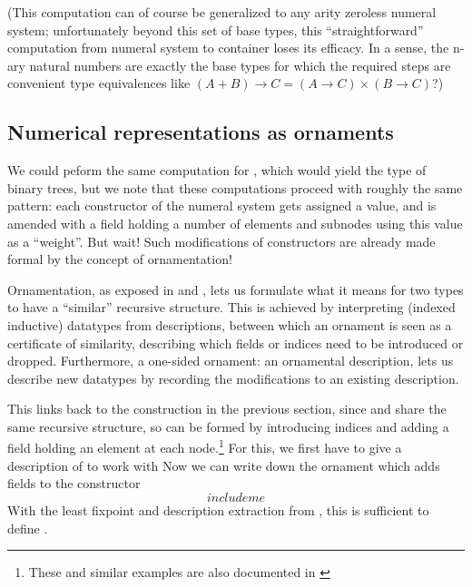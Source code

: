 \documentclass[Main.tex]{subfiles}
\begin{document}
(This computation can of course be generalized to any arity zeroless numeral system; unfortunately beyond this set of base types, this ``straightforward'' computation from numeral system to container loses its efficacy. In a sense, the n-ary natural numbers are exactly the base types for which the required steps are convenient type equivalences like $(A + B) \to C = (A \to C) \times (B \to C)$?)

\subsection{Numerical representations as ornaments}
We could peform the same computation for \bL{}, which would yield the type of binary trees, but we note that these computations proceed with roughly the same pattern: each constructor of the numeral system gets assigned a value, and is amended with a field holding a number of elements and subnodes using this value as a ``weight''. But wait! Such modifications of constructors are already made formal by the concept of ornamentation!

Ornamentation, as exposed in \cite{algorn} and \cite{progorn}, lets us formulate what it means for two types to have a ``similar'' recursive structure. This is achieved by interpreting (indexed inductive) datatypes from descriptions, between which an ornament is seen as a certificate of similarity, describing which fields or indices need to be introduced or dropped. Furthermore, a one-sided ornament: an ornamental description, lets us describe new datatypes by recording the modifications to an existing description.

This links back to the construction in the previous section, since \bN{} and  share the same recursive structure, so  can be formed by introducing indices and adding a field holding an element at each node.\footnote{These and similar examples are also documented in \cite{progorn}} For this, we first have to give a description of \bN{} to work with
Now we can write down the ornament which adds fields to the  constructor
\[ include me \]
With the least fixpoint and description extraction from \cite{progorn}, this is sufficient to define .
\end{document}
